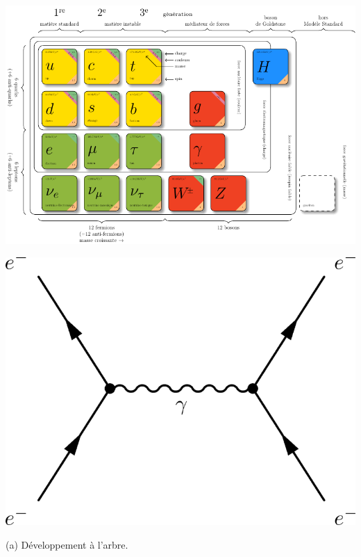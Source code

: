\begin{minipagewithmarginpars}[h]{\textwidth}
\vspace{-0.5cm}
\centering
\hspace*{-1.5cm}
\includegraphics[scale=1]{SM/bestiaire.pdf}
%
\label{bestiaire}
\marginpar
{
\vspace*{1.5cm}
\centering
\includegraphics[width=\marginparwidth]{SM/feyn0.png}
\begin{center}\normalfont\small {(a) Développement à l'arbre.}\end{center}
}
\end{minipagewithmarginpars}
